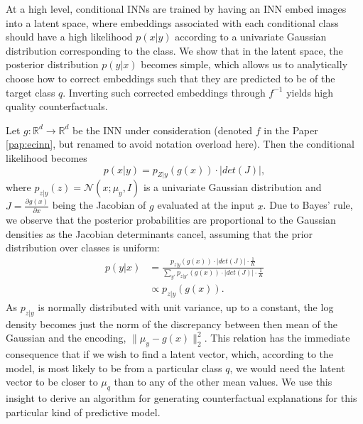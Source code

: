 \documentclass[11pt,a4paper,twoside,openright,final]{memoir}
\newcommand*{\paperref}[1]{Paper \hyperref[#1]{\ref{#1}}}
\begin{document}
At a high level, conditional INNs are trained by having an INN embed images into a latent space, where embeddings associated with each conditional class should have a high likelihood $p(x|y)$ according to a univariate Gaussian distribution corresponding to the class.
We show that in the latent space, the posterior distribution $p(y|x)$ becomes simple, which allows us to analytically choose how to correct embeddings such that they are predicted to be of the target class $q$. 
Inverting such corrected embeddings through $f^{-1}$ yields high quality counterfactuals. 

Let $g: \mathbb{R}^{d} \rightarrow \mathbb{R}^{d}$ be the INN under consideration (denoted $f$ in the \paperref{pap:ecinn}, but renamed to avoid notation overload here).
Then the conditional likelihood becomes
\begin{equation}\label{eq:conditional-likelihood}
    p(x | y) = p_{Z|y}(g(x)) \cdot \left| det\left( J \right)\right|,
\end{equation}
where $p_{z|y}(z) = \mathcal{N}(x; \mu_y, I)$ is a univariate Gaussian distribution and $J=\frac{\partial g(x)}{\partial x}$ being the Jacobian of $g$ evaluated at the input $x$. 
Due to  Bayes' rule, we observe that the posterior probabilities are proportional to the Gaussian densities as the Jacobian determinants cancel, assuming that the prior distribution over classes is uniform: 
\begin{align}\label{eq:proportional} 
    p(y | x) &= \frac{p_{z|y}( g(x) ) \cdot \left| det\left( J \right)\right| \cdot \frac{1}{K}}{\sum_{y'} p_{z|y'}( g(x) ) \cdot \left| det \left(  J \right) \right| \cdot \frac{1}{K}}\\
    &\propto p_{z|y}(g(x)).
\end{align}
As $p_{z|y}$ is normally distributed with unit variance, up to a constant, the log density becomes just the norm of the discrepancy between then mean of the Gaussian and the encoding, $\|\mu_y - g(x)\|_2^2$. 
This relation has the immediate consequence that if we wish to find a latent vector, which, according to the model, is most likely to be from a particular class $q$, we would need the latent vector to be closer to $\mu_q$ than to any of the other mean values. 
We use this insight to derive an algorithm for generating counterfactual explanations for this particular kind of predictive model. 
\end{document}
